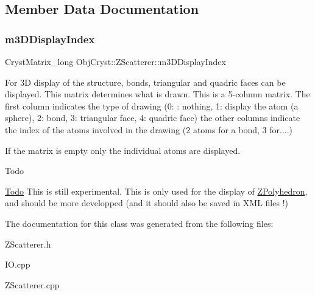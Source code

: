 \subsection{Member Data Documentation}
\mbox{\label{class_obj_cryst_1_1_z_scatterer_aa02e92087f85784a74d1bdcebf178da9}} 
\subsubsection{\texorpdfstring{m3DDisplayIndex}{m3DDisplayIndex}}
{\footnotesize\ttfamily Cryst\+Matrix\+\_\+long Obj\+Cryst\+::\+Z\+Scatterer\+::m3\+D\+Display\+Index\hspace{0.3cm}{\ttfamily [protected]}}

For 3D display of the structure, bonds, triangular and quadric faces can be displayed. This matrix determines what is drawn. This is a 5-\/column matrix. The first column indicates the type of drawing (0\+: \+: nothing, 1\+: display the atom (a sphere), 2\+: bond, 3\+: triangular face, 4\+: quadric face) the other columns indicate the index of the atoms involved in the drawing (2 atoms for a bond, 3 for....)

If the matrix is empty only the individual atoms are displayed.

\begin{DoxyRefDesc}{Todo}
\item[\mbox{\hyperlink{todo__todo000018}{Todo}}]This is still experimental. This is only used for the display of \mbox{\hyperlink{class_obj_cryst_1_1_z_polyhedron}{Z\+Polyhedron}}, and should be more developped (and it should also be saved in X\+ML files !) \end{DoxyRefDesc}


The documentation for this class was generated from the following files\+:\begin{DoxyCompactItemize}
\item 
Z\+Scatterer.\+h\item 
I\+O.\+cpp\item 
Z\+Scatterer.\+cpp\end{DoxyCompactItemize}
